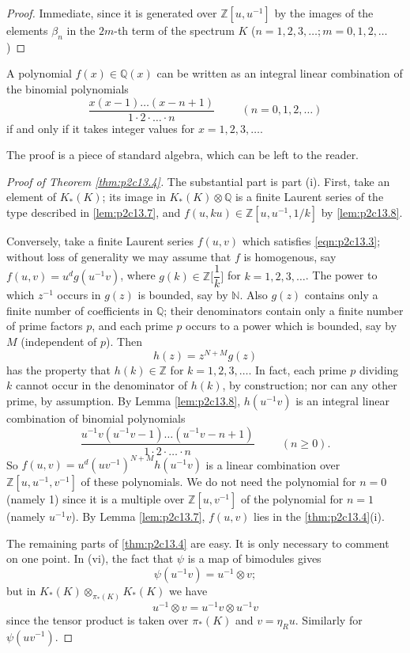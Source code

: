 \documentclass[../main]{subfiles}
\begin{document}
\begin{proof}
Immediate, since it is generated over $\mathbb{Z}[u,u^{-1}]$ by the images of the elements $\beta_n$ in the $2m$-th term of the spectrum $K$ ($n=1,2,3,\ldots; m=0,1,2,\ldots$)
\end{proof}
\begin{customlemma}{13.8}
\label{lem:p2c13.8}
A polynomial $f(x)\in\mathbb{Q}(x)$ can be written as an integral linear combination of the binomial polynomials \[\dfrac{x(x-1)\ldots(x-n+1)}{1\cdot 2 \cdot \ldots \cdot n}\hspace{1cm} (n=0,1,2,\dots)\]
if and only if it takes integer values for $x=1,2,3,\dots$.
\end{customlemma}
The proof is a piece of standard algebra, which can be left to the
reader.
\begin{proof}[Proof of Theorem \ref{thm:p2c13.4}]
The substantial part is part (i). First, take an element of $K_\ast(K)$; its image in $K_\ast(K)\otimes\mathbb{Q}$ is a finite Laurent series of the type described in \eqref{lem:p2c13.7}, and $f(u, ku)\in \mathbb{Z}[u,u^{-1}, 1/k]$ by \eqref{lem:p2c13.8}.

Conversely, take a finite Laurent series $f(u,v)$ which satisfies \eqref{eqn:p2c13.3}; without loss of generality we may assume that $f$ is homogenous, say $f(u,v) = u^dg(u^{-1}v)$, where $g(k)\in\mathbb{Z}\Big[\dfrac{1}{k}\Big]$ for $k=1,2,3,\dots$. The power to which $z^{-1}$ occurs in $g(z)$ is bounded, say by $\mathbb{N}$. Also $g(z)$ contains only a finite number of coefficients in $\mathbb{Q}$; their denominators contain only a finite number of prime factors $p$, and each prime $p$ occurs to a power which is bounded, say by $M$ (independent of $p$). Then \[h(z) = z^{N+M}g(z)\] has the property that $h(k) \in \mathbb{Z}$ for $k = 1,2,3,\dots$. In fact, each prime $p$ dividing $k$ cannot occur in the denominator of $h(k)$, by construction; nor can any other prime, by assumption. By Lemma \ref{lem:p2c13.8}, $h(u^{-1}v)$ is an integral linear combination of binomial polynomials \[\dfrac{u^{-1}v(u^{-1}v-1)\ldots(u^{-1}v-n+1)}{1\cdot 2 \cdot \ldots \cdot n}\hspace{1cm} (n\ge 0).\] So $f(u,v) = u^d (uv^{-1})^{N+M}h(u^{-1}v)$ is a linear combination over $\mathbb{Z}[u,u^{-1},v^{-1}]$ of these polynomials. We do not need the polynomial for $n=0$ (namely 1) since it is a multiple over $\mathbb{Z}[u,v^{-1}]$ of the polynomial for $n=1$ (namely $u^{-1}v$). By Lemma \ref{lem:p2c13.7}, $f(u,v)$ lies in the \eqref{thm:p2c13.4}(i). 

The remaining parts of \eqref{thm:p2c13.4} are easy. It is only necessary to
comment on one point. In (vi), the fact that $\psi$ is a map of bimodules
gives \[\psi(u^{-1} v) = u^{-1}\otimes v;\] but in $K_\ast(K)\otimes_{\pi_\ast(K)} K_\ast(K)$ we have \[u^{-1}\otimes v = u^{-1}v\otimes u^{-1}v\] since the tensor product is taken over $\pi_\ast(K)$ and $v=\eta_R u$. Similarly for $\psi(uv^{-1})$.
\end{proof}
\end{document}
